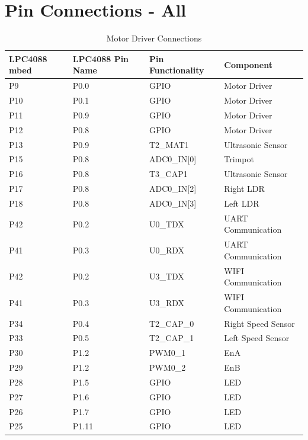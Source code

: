 \documentclass[12pt]{article}
\begin{document}
\section{Pin Connections - All}
\begin {table}[H]
\begin {center}
\begin{tabular}{|p{3cm}|p{3cm}|p{3cm}|p{4cm}|} 
\hline 
\textbf{LPC4088 mbed} & \textbf{LPC4088 Pin Name} & \textbf{Pin Functionality} & \textbf{Component} \\ 
\hline 
P9 & P0.0 & GPIO & Motor Driver \\ 
\hline 
P10 & P0.1 & GPIO & Motor Driver \\
\hline 
P11 & P0.9 & GPIO & Motor Driver \\ 
\hline 
P12 & P0.8 & GPIO & Motor Driver \\
\hline
P13 & P0.9 & T2\_MAT1 & Ultrasonic Sensor \\ 
\hline 
P15 & P0.8 & ADC0\_IN[0] & Trimpot \\
\hline 
P16 & P0.8 & T3\_CAP1 & Ultrasonic Sensor \\
\hline 
P17 & P0.8 & ADC0\_IN[2] & Right LDR \\
\hline 
P18 & P0.8 & ADC0\_IN[3] & Left LDR \\
\hline
P42 & P0.2 & U0\_TDX & UART Communication \\
\hline 
P41 & P0.3 & U0\_RDX & UART Communication \\
\hline
P42 & P0.2 & U3\_TDX & WIFI Communication \\
\hline 
P41 & P0.3 & U3\_RDX & WIFI Communication \\
\hline
P34 & P0.4 & T2\_CAP\_0 & Right Speed Sensor \\
\hline 
P33 & P0.5 & T2\_CAP\_1 & Left Speed Sensor \\
\hline 
P30 & P1.2 & PWM0\_1 & EnA \\
\hline 
P29 & P1.2 & PWM0\_2 & EnB \\
\hline 
P28 & P1.5 & GPIO & LED \\
\hline 
P27 & P1.6 & GPIO & LED \\
\hline 
P26 & P1.7 & GPIO & LED \\
\hline 
P25 & P1.11 & GPIO & LED \\
\hline
\end{tabular}
\end {center}
\caption {Motor Driver Connections}
\end {table}

\newpage
\newpage
\end{document}
